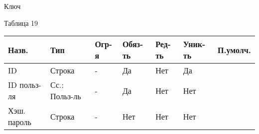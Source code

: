 \documentclass[../document.tex]{subfiles}
\begin{document}
\\\\
Ключ
\begin{flushright}
  Таблица 19
\end{flushright}
\begin{tabular}{ | l | l | l | l | l | l | l | }
  \hline
  Назв.       & Тип           & Огр-я & Обяз-ть & Ред-ть & Уник-ть & П.умолч. \\
  \hline
  ID          & Строка        & -     & Да      & Нет    & Да      &          \\
  ID польз-ля & Сс.: Польз-ль & -     & Да      & Нет    & Нет     &          \\
  Хэш. пароль & Строка        & -     & Нет     & Нет    & Нет     &          \\
  \hline
\end{tabular}
\end{document}
